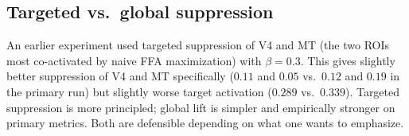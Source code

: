 \documentclass{article}
\begin{document}
\subsection{Targeted vs.\ global suppression}
An earlier experiment used targeted suppression of V4 and MT (the two ROIs most co-activated by naive FFA maximization) with $\beta=0.3$. This gives slightly better suppression of V4 and MT specifically ($0.11$ and $0.05$ vs.\ $0.12$ and $0.19$ in the primary run) but slightly worse target activation ($0.289$ vs.\ $0.339$). Targeted suppression is more principled; global lift is simpler and empirically stronger on primary metrics. Both are defensible depending on what one wants to emphasize.
\end{document}

